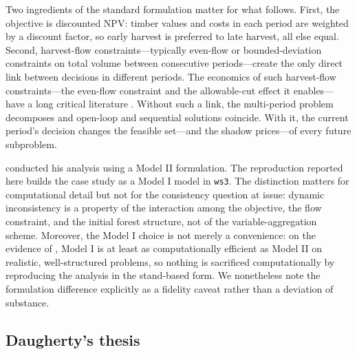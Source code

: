 Two ingredients of the standard formulation matter for what follows. First, the objective is discounted NPV: timber values and costs in each period are weighted by a discount factor, so early harvest is preferred to late harvest, all else equal. Second, harvest-flow constraints---typically even-flow or bounded-deviation constraints on total volume between consecutive periods---create the only direct link between decisions in different periods. The economics of such harvest-flow constraints—the even-flow constraint and the allowable-cut effect it enables—have a long critical literature \citep{thompson1966traditional,schweitzer1972allowable,luckert1995allowable,hegan2000economic}. Without such a link, the multi-period problem decomposes and open-loop and sequential solutions coincide. With it, the current period's decision changes the feasible set---and the shadow prices---of every future subproblem.

\citet{daugherty1991credibility} conducted his analysis using a Model II formulation. The reproduction reported here builds the case study as a Model I model in \texttt{ws3}. The distinction matters for computational detail but not for the consistency question at issue: dynamic inconsistency is a property of the interaction among the objective, the flow constraint, and the initial forest structure, not of the variable-aggregation scheme. Moreover, the Model I choice is not merely a convenience: on the evidence of \citet{martin2017comparing}, Model I is at least as computationally efficient as Model II on realistic, well-structured problems, so nothing is sacrificed computationally by reproducing the analysis in the stand-based form. We nonetheless note the formulation difference explicitly as a fidelity caveat rather than a deviation of substance.

\hypertarget{daughertys-thesis}{%
\subsection{Daugherty's thesis}\label{daughertys-thesis}}


